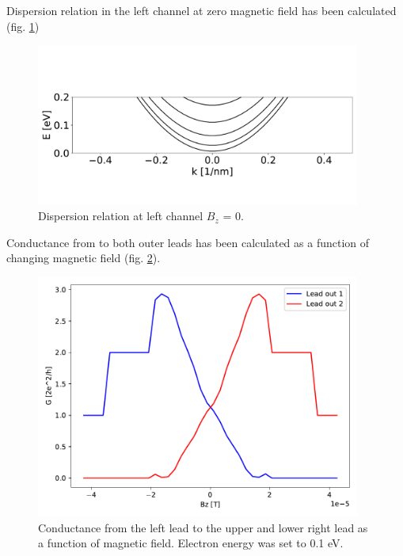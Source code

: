 \documentclass[12pt, a4paper]{article}
\begin{document}
Dispersion relation in the left channel at zero magnetic field has been calculated (fig. \ref{fig:ex3_disp})

\begin{figure}[h]
    \begin{center}
        \includegraphics[width=0.95\textwidth]{../plots/kwant_ex3_dispersion.pdf}
    \end{center}
    \caption{Dispersion relation at left channel $B_z$ = 0.}
    \label{fig:ex3_disp}
\end{figure}

Conductance from to both outer leads has been calculated as a function of changing magnetic field (fig. \ref{fig:ex3_cond}).

\begin{figure}[H]
    \begin{center}
        \includegraphics[width=0.95\textwidth]{../plots/conductance_ex3.pdf}
    \end{center}
    \caption{Conductance from the left lead to the upper and lower right lead as a function of magnetic field. Electron energy was set to 0.1 eV.}
    \label{fig:ex3_cond}
\end{figure}
\end{document}
